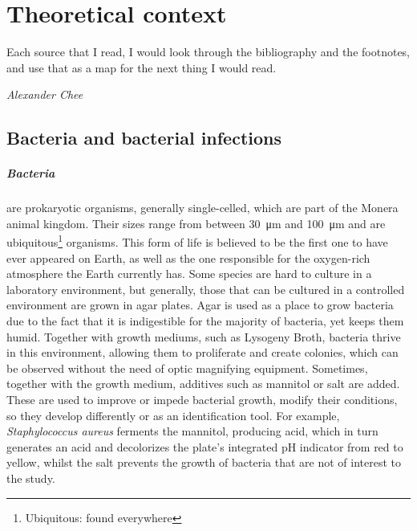 \chapter{Theoretical context}
\epigraph{Each source that I read, I would look through the bibliography and the footnotes, and use that as a map for the next thing I would read.}{\textit{Alexander Chee}}
\section{Bacteria and bacterial infections}
\paragraph{Bacteria} are prokaryotic organisms, generally single-celled, which are part of the Monera animal kingdom. Their sizes range from between \SI{30}{\micro\metre} and \SI{100}{\micro\metre} and are ubiquitous\footnote{Ubiquitous: found everywhere} organisms. This form of life is believed to be the first one to have ever appeared on Earth, as well as the one responsible for the oxygen-rich atmosphere the Earth currently has. Some species are hard to culture in a laboratory environment, but generally, those that can be cultured in a controlled environment are grown in agar plates\cite{murrayMicrobiologiaMedica2013}. \newline
Agar is used as a place to grow bacteria due to the fact that it is indigestible for the majority of bacteria, yet keeps them humid. Together with growth mediums, such as Lysogeny Broth, bacteria thrive in this environment, allowing them to proliferate and create colonies, which can be observed without the need of optic magnifying equipment. Sometimes, together with the growth medium, additives such as mannitol or salt are added. These are used to improve or impede bacterial growth, modify their conditions, so they develop differently or as an identification tool. For example, \emph{Staphylococcus aureus} ferments the mannitol, producing acid, which in turn generates an acid and decolorizes the plate's integrated pH indicator from red to yellow, whilst the salt prevents the growth of bacteria that are not of interest to the study\cite{gamazoManualPracticoMicrobiologia2010}.
